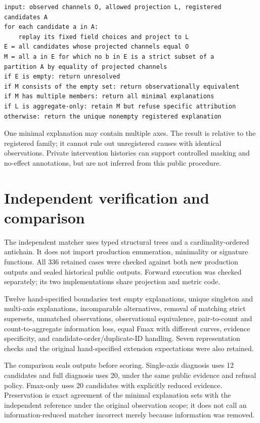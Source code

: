 \documentclass[11pt]{article}
\begin{document}
\begin{small}\begin{verbatim}
input: observed channels O, allowed projection L, registered candidates A
for each candidate a in A:
    replay its fixed field choices and project to L
E = all candidates whose projected channels equal O
M = all a in E for which no b in E is a strict subset of a
partition A by equality of projected channels
if E is empty: return unresolved
if M consists of the empty set: return observationally equivalent
if M has multiple members: return all minimal explanations
if L is aggregate-only: retain M but refuse specific attribution
otherwise: return the unique nonempty registered explanation
\end{verbatim}\end{small}

One minimal explanation may contain multiple axes. The result is relative to
the registered family; it cannot rule out unregistered causes with identical
observations. Private intervention histories can support controlled masking and
no-effect annotations, but are not inferred from this public procedure.

\section{Independent verification and comparison}

The independent matcher uses typed structural trees and a cardinality-ordered
antichain. It does not import production enumeration, minimality or signature
functions. All 336 retained cases were checked against both new production
outputs and sealed historical public outputs. Forward execution was checked
separately; its two implementations share projection and metric code.

Twelve hand-specified boundaries test empty explanations, unique singleton and
multi-axis explanations, incomparable alternatives, removal of matching strict
supersets, unmatched observations, observational equivalence, pair-to-count and
count-to-aggregate information loss, equal Fmax with different curves, evidence
specificity, and candidate-order/duplicate-ID handling. Seven representation
checks and the original hand-specified extension expectations were also retained.

The comparison seals outputs before scoring. Single-axis diagnosis uses 12
candidates and full diagnosis uses 20, under the same public evidence and refusal
policy. Fmax-only uses 20 candidates with explicitly reduced evidence. Preservation
is exact agreement of the minimal explanation sets with the independent reference
under the original observation scope; it does not call an information-reduced
matcher incorrect merely because information was removed.
\end{document}

